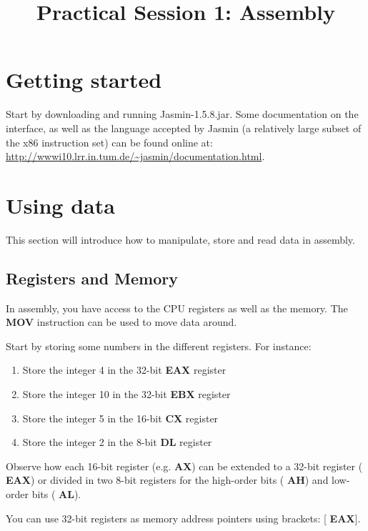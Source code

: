 \documentclass[a4paper, 11pt]{article}
\title{Practical Session 1: Assembly}
\author{}
\newenvironment{instruction}%
{\vspace{15pt}
	\noindent\begin{Sbox}
		\begin{minipage}{\textwidth}}%
		{\end{minipage}
	\end{Sbox}	
\shadowbox{\TheSbox} \vspace{10pt}}
\newcommand{\asmop}[1]{{\sffamily \bfseries \color{asmblue} #1}}
\newcommand{\asmreg}[1]{{\sffamily \bfseries \color{asmgreen} #1}}
\begin{document}
\maketitle


\section{Getting started}

Start by downloading and running \textsf{Jasmin-1.5.8.jar}. Some documentation on the interface, as well as the language accepted by Jasmin (a relatively large subset of the x86 instruction set) can be found online at: \url{http://wwwi10.lrr.in.tum.de/~jasmin/documentation.html}.


\section{Using data}

This section will introduce how to manipulate, store and read data in assembly.

\subsection{Registers and Memory}

In assembly, you have access to the CPU registers as well as the memory. The \asmop{MOV} instruction can be used to move data around. 

\begin{instruction}
Start by storing some numbers in the different registers. For instance:
	\begin{enumerate}
		\item Store the integer 4 in the 32-bit \asmreg{EAX} register
		\item Store the integer 10 in the 32-bit \asmreg{EBX} register 
		\item Store the integer 5 in the 16-bit \asmreg{CX} register
		\item Store the integer 2 in the 8-bit \asmreg{DL} register
	\end{enumerate}
\end{instruction}


Observe how each 16-bit register (e.g. \asmreg{AX}) can be extended to a 32-bit register (\asmreg{EAX}) or divided in two 8-bit registers for the high-order bits (\asmreg{AH}) and low-order bits (\asmreg{AL}). 

You can use 32-bit registers as memory address pointers using brackets: [\asmreg{EAX}]. 
\end{document}
